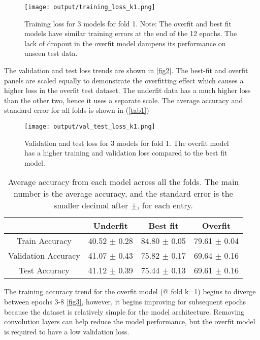 \documentclass[12pt]{report}
\begin{document}
\begin{enumerate}
    \begin{figure}[H]
        \centering
        \texttt{[image: output/training\_loss\_k1.png]}
        \caption{Training loss for 3 models for fold 1. Note: The overfit and best fit models have similar training errors at the end of the 12 epochs. The lack of dropout in the 
        overfit model dampens its performance on unseen test data.}
        \label{fig1}
    \end{figure}

    The validation and test loss trends are shown in \autoref{fig2}. The best-fit and overfit panels are scaled equally to demonstrate the overfitting effect which causes a higher 
    loss in the overfit test dataset. The underfit data has a much higher loss than the other two, hence it uses a separate scale. The average accuracy and standard error for all 
    folds is shown in (\autoref{tab1})

    \begin{figure}[H]
        \centering
        \texttt{[image: output/val\_test\_loss\_k1.png]}
        \caption{Validation and test loss for 3 models for fold 1. The overfit model has a higher training and validation loss compared to the best fit model.}
        \label{fig2}
    \end{figure}

    \begin{table}[h]
    \centering
    \begin{tabular}{|c|c|c|c|}
    \hline
    \  & Underfit & Best fit & Overfit \\ \hline
    Train Accuracy & 40.52 $\pm$ 0.28 & 84.80 $\pm$ 0.05 & 79.61 $\pm$ 0.04 \\ \hline
    Validation Accuracy & 41.07 $\pm$ 0.43 & 75.82 $\pm$ 0.17 & 69.64 $\pm$ 0.16 \\ \hline
    Test Accuracy & 41.12 $\pm$ 0.39 & 75.44 $\pm$ 0.13 & 69.61 $\pm$ 0.16 \\ \hline
    \end{tabular}
    \caption{Average accuracy from each model across all the folds. The main number is the average accuracy, and the standard error is the smaller
    decimal after $\pm$, for each entry.}
    \label{tab1}
    \end{table}

    The training accuracy trend for the overfit model (@ fold k=1) begins to diverge between epochs 3-8 \autoref{fig3}, however, it begins improving for subsequent epochs because 
    the dataset is relatively simple for the model architecture. Removing convolution layers can help reduce the model performance, but the overfit model is required to have a low 
    validation loss.


\end{enumerate}
\end{document}
